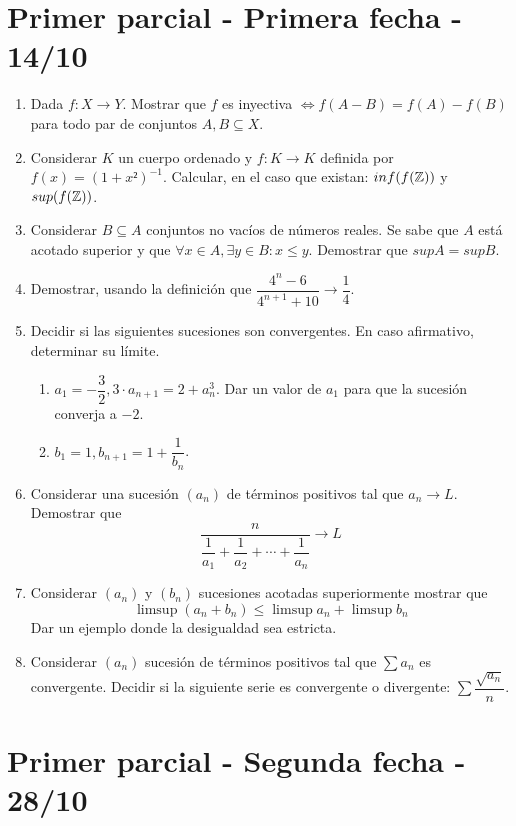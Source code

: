 \section{Primer parcial - Primera fecha - 14/10}

\begin{enumerate}
  \item Dada $f: X \to Y$. Mostrar que $f$ es inyectiva $\iff f(A-B) = f(A) - f(B)$ para todo par de conjuntos $A, B \subseteq X$.
  \item Considerar $K$ un cuerpo ordenado y $f: K \to K$ definida por $f(x) = (1+x²)^{-1}$. Calcular, en el caso que existan: $inf(f(\mathbb{Z}))$ y $sup(f(\mathbb{Z}))$.
  \item Considerar $B \subseteq A$ conjuntos no vacíos de números reales. Se sabe que $A$ está acotado superior y que $\forall x \in A, \exists y \in B : x \leq y$. Demostrar que $sup A = sup B$.
  \item Demostrar, usando la definición que $\dfrac{4^n - 6}{4^{n+1}+10} \to \dfrac{1}{4}$.
  \item Decidir si las siguientes sucesiones son convergentes. En caso afirmativo, determinar su límite. \begin{enumerate}
    \item $a_1 = -\dfrac{3}{2}, 3 \cdot a_{n+1} = 2 + a_n^3$. Dar un valor de $a_1$ para que la sucesión converja a $-2$.
    \item $b_1 = 1, b_{n+1} = 1 + \dfrac{1}{b_n}$.
  \end{enumerate}
  \item Considerar una sucesión $(a_n)$ de términos positivos tal que $a_n \to L$. Demostrar que \begin{equation} \dfrac{n}{\dfrac{1}{a_1} + \dfrac{1}{a_2} + \cdots + \dfrac{1}{a_n}} \to L \end{equation} 
  \item Considerar $(a_n)$ y $(b_n)$ sucesiones acotadas superiormente mostrar que \begin{equation} \limsup(a_n + b_n) \leq \limsup a_n + \limsup b_n \end{equation} Dar un ejemplo donde la desigualdad sea estricta.
  \item Considerar $(a_n)$ sucesión de términos positivos tal que $\sum a_n$ es convergente. Decidir si la siguiente serie es convergente o divergente: $\sum \dfrac{\sqrt{a_n}}{n}$.
\end{enumerate}

\section{Primer parcial - Segunda fecha - 28/10}

